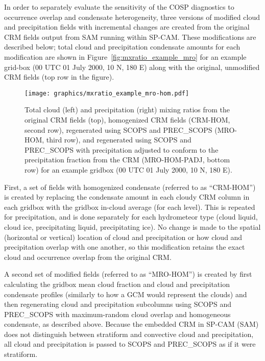 In order to separately evaluate the sensitivity of the COSP diagnostics
to occurrence overlap and condensate heterogeneity, three versions of
modified cloud and precipitation fields with incremental changes are
created from the original CRM fields output from SAM running within
SP-CAM. These modifications are described below; total cloud and
precipitation condensate amounts for each modification are shown in
Figure~\ref{fig:mxratio_example_mro} for an example grid-box (00 UTC 01
July 2000, 10 N, 180 E) along with the original, unmodified CRM fields
(top row in the figure).

\begin{figure}[tp]
\centering
\texttt{[image: graphics/mxratio\_example\_mro-hom.pdf]}
\caption{\label{fig:mxratio_example_mro}Total cloud (left) and
precipitation (right) mixing ratios from the original CRM fields (top),
homogenized CRM fields (CRM-HOM, second row), regenerated using SCOPS
and PREC\_SCOPS (MRO-HOM, third row), and regenerated using SCOPS and
PREC\_SCOPS with precipitation adjusted to conform to the precipitation
fraction from the CRM (MRO-HOM-PADJ, bottom row) for an example gridbox
(00 UTC 01 July 2000, 10 N, 180
E).}\label{fig:mxratioux5fexampleux5fmro}
\end{figure}

First, a set of fields with homogenized condensate (referred to as
``CRM-HOM'') is created by replacing the condensate amount in each
cloudy CRM column in each gridbox with the gridbox in-cloud average (for
each level). This is repeated for precipitation, and is done separately
for each hydrometeor type (cloud liquid, cloud ice, precipitating
liquid, precipitating ice). No change is made to the spatial (horizontal
or vertical) location of cloud and precipitation or how cloud and
precipitation overlap with one another, so this modification retains the
exact cloud and occurrence overlap from the original CRM.

A second set of modified fields (referred to as ``MRO-HOM'') is created
by first calculating the gridbox mean cloud fraction and cloud and
precipitation condensate profiles (similarly to how a GCM would
represent the clouds) and then regenerating cloud and precipitation
subcolumns using SCOPS and PREC\_SCOPS with maximum-random cloud overlap
and homogeneous condensate, as described above. Because the embedded CRM
in SP-CAM (SAM) does not distinguish between stratiform and convective
cloud and precipitation, all cloud and precipitation is passed to SCOPS
and PREC\_SCOPS as if it were stratiform.

